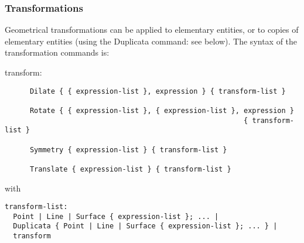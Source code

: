 \subsubsection{Transformations}

Geometrical transformations can be applied to elementary entities, or to copies of elementary entities (using the Duplicata command: see below). The syntax of the transformation commands is:

transform:

\begin{verbatim}
      Dilate { { expression-list }, expression } { transform-list }

      Rotate { { expression-list }, { expression-list }, expression } 
                                                         { transform-list }

      Symmetry { expression-list } { transform-list }

      Translate { expression-list } { transform-list }
\end{verbatim}
 
   
    
with
\begin{verbatim}
transform-list: 
  Point | Line | Surface { expression-list }; ... |
  Duplicata { Point | Line | Surface { expression-list }; ... } |
  transform 
\end{verbatim}

